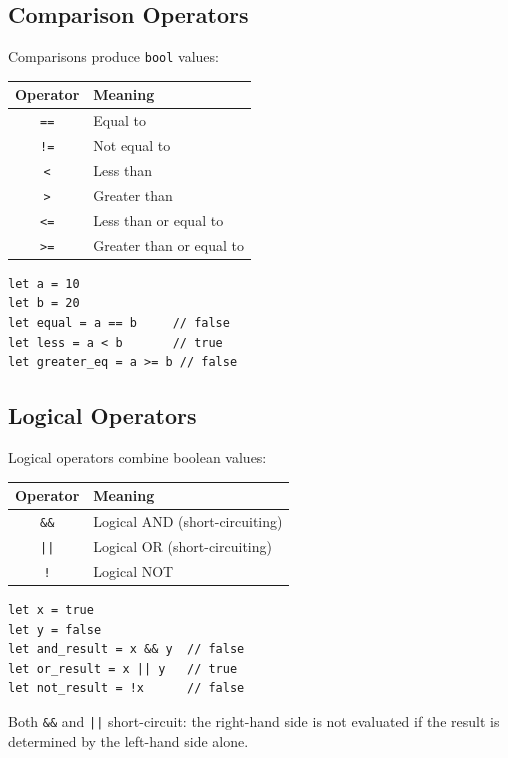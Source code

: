 \subsection{Comparison Operators}

Comparisons produce \texttt{bool} values:

\begin{center}
\begin{tabular}{cl}
\textbf{Operator} & \textbf{Meaning} \\
\hline
\texttt{==} & Equal to \\
\texttt{!=} & Not equal to \\
\texttt{<} & Less than \\
\texttt{>} & Greater than \\
\texttt{<=} & Less than or equal to \\
\texttt{>=} & Greater than or equal to \\
\end{tabular}
\end{center}

\begin{lstlisting}
let a = 10
let b = 20
let equal = a == b     // false
let less = a < b       // true
let greater_eq = a >= b // false
\end{lstlisting}

\subsection{Logical Operators}

Logical operators combine boolean values:

\begin{center}
\begin{tabular}{cl}
\textbf{Operator} & \textbf{Meaning} \\
\hline
\texttt{\&\&} & Logical AND (short-circuiting) \\
\texttt{||} & Logical OR (short-circuiting) \\
\texttt{!} & Logical NOT \\
\end{tabular}
\end{center}

\begin{lstlisting}
let x = true
let y = false
let and_result = x && y  // false
let or_result = x || y   // true
let not_result = !x      // false
\end{lstlisting}

Both \texttt{\&\&} and \texttt{||} short-circuit: the right-hand side is not evaluated if the result is determined by the left-hand side alone.


